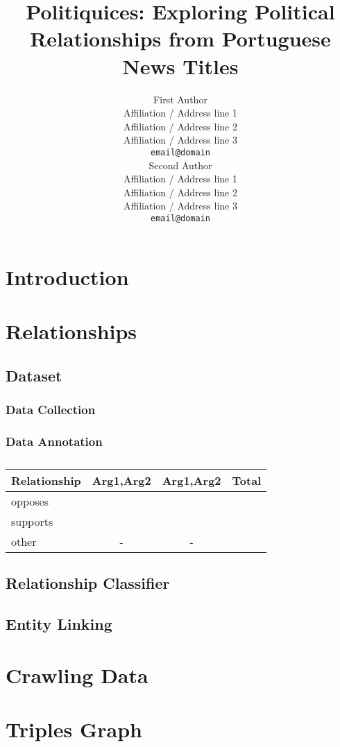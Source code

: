 \documentclass[11pt,a4paper]{article}
\title{Politiquices: Exploring Political Relationships from Portuguese News Titles}
\author{First Author \\
  Affiliation / Address line 1 \\
  Affiliation / Address line 2 \\
  Affiliation / Address line 3 \\
  \texttt{email@domain} \\\And
  Second Author \\
  Affiliation / Address line 1 \\
  Affiliation / Address line 2 \\
  Affiliation / Address line 3 \\
  \texttt{email@domain} \\}
\date{}
\begin{document}
\maketitle
\begin{abstract}

\end{abstract}


\section{Introduction}
\label{sec:intro}


\section{Relationships}
\label{sec:rel}






\subsection{Dataset}
\label{subsec:rel_data}

\subsubsection{Data Collection}
\label{subsubsec:rel_data_collec}


\subsubsection{Data Annotation}
\label{subsubsec:rel_data_annot}


\begin{table}[!h]
\centering
\begin{tabular}{lccr}
\hline \textbf{Relationship} & \textbf{Arg1,Arg2} & \textbf{Arg1,Arg2} & \textbf{Total} \\ \hline
opposes        &  &  \\
supports       &  &  \\
other          & - & - & \\
\hline
\end{tabular}
\caption{\label{font-table}  }
\end{table}

\subsection{Relationship Classifier}
\label{subsec:rel_classifier}


\subsection{Entity Linking}
\label{subsec:ent_linking}


\section{Crawling Data}
\label{sec:crawl}


\section{Triples Graph}
\label{sec:triples_graph}

%
%
\end{document}

